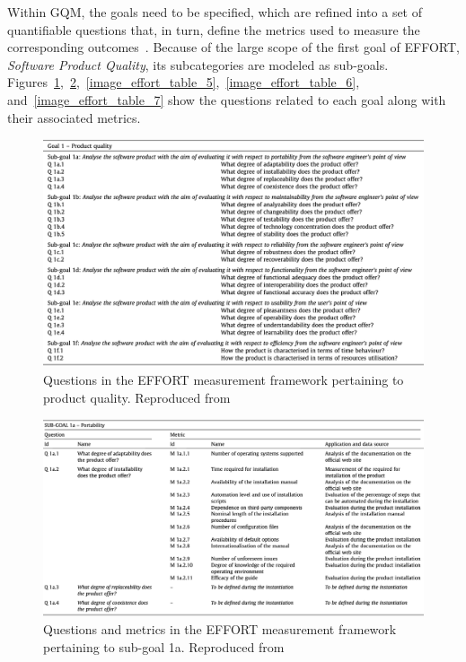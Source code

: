 Within GQM, the goals need to be specified, which are refined into a set of quantifiable
questions that, in turn, define the metrics used to measure the corresponding
outcomes~\cite{gqm}. Because of the large scope of the first goal of
EFFORT, \textit{Software Product Quality}, its subcategories are modeled as
sub-goals. Figures~\ref{image_effort_table_3},~\ref{image_effort_table_4},~\ref{image_effort_table_5},~\ref{image_effort_table_6},
and~\ref{image_effort_table_7} show the questions related to each goal
along with their associated metrics.

\begin{figure}[h!]
\centering
\includegraphics{images/table_3}
\caption{Questions in the EFFORT measurement framework pertaining to product quality. Reproduced from~\cite{effort}}
    \label{image_effort_table_3}
\end{figure}

\begin{figure}[h!]
\centering
\includegraphics{images/table_4}
\caption{Questions and metrics in the EFFORT measurement framework pertaining to sub-goal 1a. Reproduced from~\cite{effort}}
\label{image_effort_table_4}

\end{figure}

